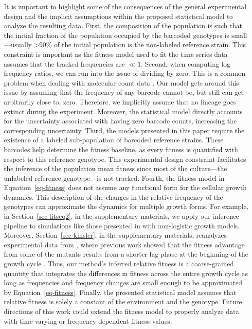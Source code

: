 \documentclass[
]{scrartcl}
\begin{document}
\begin{refsegment}
It is important to highlight some of the consequences of the general
experimental design and the implicit assumptions within the proposed
statistical model to analyze the resulting data. First, the composition
of the population is such that the initial fraction of the population
occupied by the barcoded genotypes is small---usually \textgreater90\%
of the initial population is the non-labeled reference strain. This
constraint is important as the fitness model used to fit the time series
data assumes that the tracked frequencies are \(\ll 1\). Second, when
computing log frequency ratios, we can run into the issue of dividing by
zero. This is a common problem when dealing with molecular count data
\autocite{lovell2020}. Our model gets around this issue by assuming that
the frequency of any barcode cannot be, but still can get arbitrarily
close to, zero. Therefore, we implicitly assume that no lineage goes
extinct during the experiment. Moreover, the statistical model directly
accounts for the uncertainty associated with having zero barcode counts,
increasing the corresponding uncertainty. Third, the models presented in
this paper require the existence of a labeled sub-population of barcoded
reference strains. These barcodes help determine the fitness baseline,
as every fitness is quantified with respect to this reference genotype.
This experimental design constraint facilitates the inference of the
population mean fitness since most of the culture---the unlabeled
reference genotype---is not tracked. Fourth, the fitness model in
Equation~\ref{eq-fitness} does not assume any functional form for the
cellular growth dynamics. This description of the changes in the
relative frequency of the genotypes can approximate the dynamics for
multiple growth forms. For example, in Section~\ref{sec-fitseq2}, in the
supplementary materials, we apply our inference pipeline to simulations
like those presented in \autocite{li2023} with non-logistic growth
models. Moreover, Section~\ref{sec-kinsler}, in the supplementary
materials, reanalyzes experimental data from \autocite{kinsler2020},
where previous work showed that the fitness advantage from some of the
mutants results from a shorter lag phase at the beginning of the growth
cycle \autocite{li2018}. Thus, our method's inferred relative fitness is
a coarse-grained quantity that integrates the differences in fitness
across the entire growth cycle as long as frequencies and frequency
changes are small enough to be approximated by
Equation~\ref{eq-fitness}. Finally, the presented statistical model
assumes that relative fitness is solely a constant of the environment
and the genotype. Future directions of this work could extend the
fitness model to properly analyze data with time-varying or
frequency-dependent fitness values.


\end{refsegment}
\end{document}
